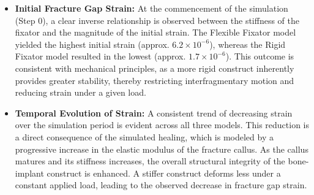 \documentclass{article}
\begin{document}
\begin{itemize}
  \item \textbf{Initial Fracture Gap Strain:} At the commencement of the simulation (Step 0), a clear inverse relationship is observed between the stiffness of the fixator and the magnitude of the initial strain. The Flexible Fixator model yielded the highest initial strain (approx. $6.2 \times 10^{-6}$), whereas the Rigid Fixator model resulted in the lowest (approx. $1.7 \times 10^{-6}$). This outcome is consistent with mechanical principles, as a more rigid construct inherently provides greater stability, thereby restricting interfragmentary motion and reducing strain under a given load.

  \item \textbf{Temporal Evolution of Strain:} A consistent trend of decreasing strain over the simulation period is evident across all three models. This reduction is a direct consequence of the simulated healing, which is modeled by a progressive increase in the elastic modulus of the fracture callus. As the callus matures and its stiffness increases, the overall structural integrity of the bone-implant construct is enhanced. A stiffer construct deforms less under a constant applied load, leading to the observed decrease in fracture gap strain.
\end{itemize}
\end{document}
